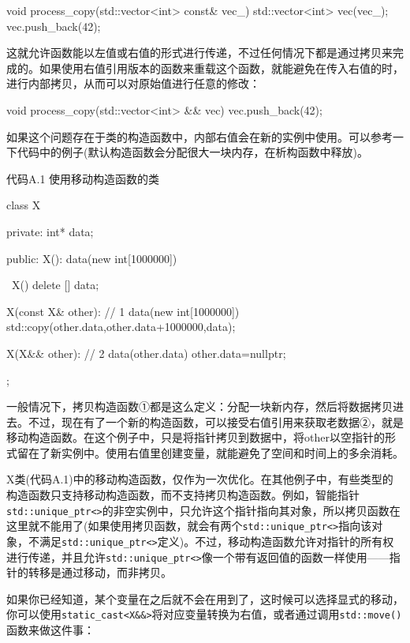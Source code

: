 \begin{cpp}
void process_copy(std::vector<int> const& vec_)
{
  std::vector<int> vec(vec_);
  vec.push_back(42);
}
\end{cpp}

这就允许函数能以左值或右值的形式进行传递，不过任何情况下都是通过拷贝来完成的。如果使用右值引用版本的函数来重载这个函数，就能避免在传入右值的时，进行内部拷贝，从而可以对原始值进行任意的修改：

\begin{cpp}
void process_copy(std::vector<int> && vec)
{
  vec.push_back(42);
}
\end{cpp}

如果这个问题存在于类的构造函数中，内部右值会在新的实例中使用。可以参考一下代码中的例子(默认构造函数会分配很大一块内存，在析构函数中释放)。

代码A.1 使用移动构造函数的类

\begin{cpp}
class X
{
private:
  int* data;

public:
  X():
    data(new int[1000000])
  {}

  ~X()
  {
    delete [] data;
  }

  X(const X& other):  // 1
   data(new int[1000000])
  {
    std::copy(other.data,other.data+1000000,data);
  }

  X(X&& other):  // 2
    data(other.data)
  {
    other.data=nullptr;
  }
};
\end{cpp}

一般情况下，拷贝构造函数①都是这么定义：分配一块新内存，然后将数据拷贝进去。不过，现在有了一个新的构造函数，可以接受右值引用来获取老数据②，就是移动构造函数。在这个例子中，只是将指针拷贝到数据中，将other以空指针的形式留在了新实例中。使用右值里创建变量，就能避免了空间和时间上的多余消耗。

X类(代码A.1)中的移动构造函数，仅作为一次优化。在其他例子中，有些类型的构造函数只支持移动构造函数，而不支持拷贝构造函数。例如，智能指针\texttt{std::unique\_ptr<>}的非空实例中，只允许这个指针指向其对象，所以拷贝函数在这里就不能用了(如果使用拷贝函数，就会有两个\texttt{std::unique\_ptr<>}指向该对象，不满足\texttt{std::unique\_ptr<>}定义)。不过，移动构造函数允许对指针的所有权进行传递，并且允许\texttt{std::unique\_ptr<>}像一个带有返回值的函数一样使用——指针的转移是通过移动，而非拷贝。

如果你已经知道，某个变量在之后就不会在用到了，这时候可以选择显式的移动，你可以使用\texttt{static\_cast<X\&\&>}将对应变量转换为右值，或者通过调用\texttt{std::move()}函数来做这件事：

